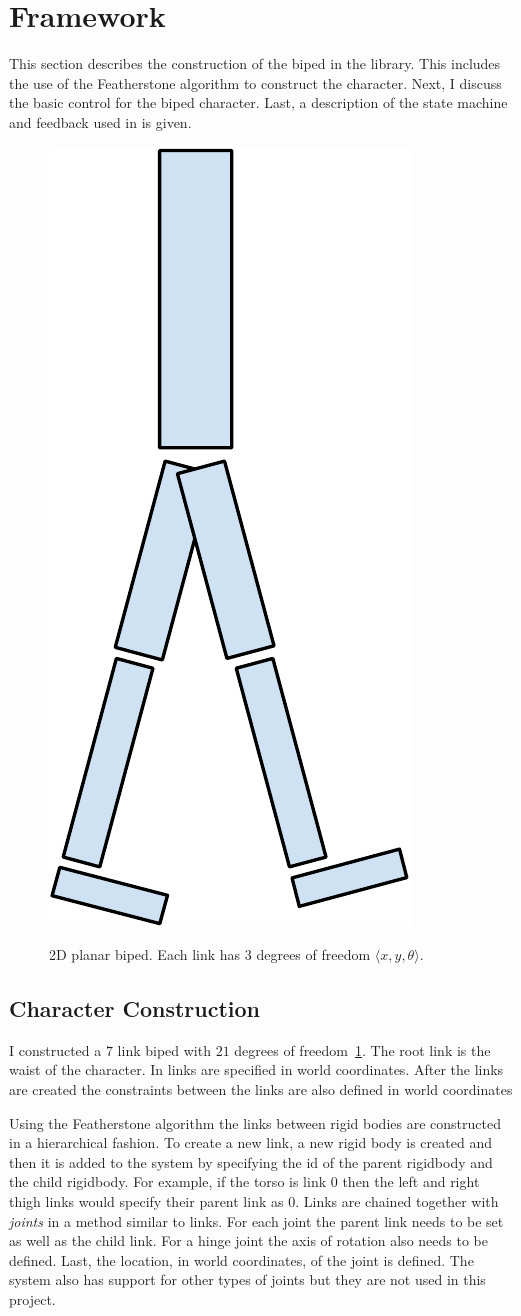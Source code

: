 
\section{Framework}
\label{sec:framework}

This section describes the construction of the biped in the \bulletPhysics library. This includes the use of the Featherstone algorithm to construct the character. Next, I discuss the basic control for the biped character. Last, a description of the state machine and feedback used in \SIMBICON is given. 

\begin{figure}[H]
\centering
	\includegraphics[width=0.2\linewidth]{../images/2D-Biped-crop.pdf} \\
	\caption{\label{figure:2d-biped} 2D planar biped. Each link has $3$ degrees of freedom $\langle x, y, \theta \rangle$.}
\end{figure}

\subsection{Character Construction}

I constructed a $7$ link biped with $21$ degrees of freedom~\ref{figure:2d-biped}. 
The root link is the waist of the character.
In \bulletPhysics links are specified in world coordinates.
After the links are created the constraints between the links are also defined in world coordinates
 
Using the Featherstone algorithm the links between rigid bodies are constructed in a hierarchical fashion. 
To create a new link, a new rigid body is created and then it is added to the system by specifying the id of the parent rigidbody and the child rigidbody. 
For example, if the torso is link $0$ then the left and right thigh links would specify their parent link as $0$.
Links are chained together with \emph{joints} in a method similar to links.
For each joint the parent link needs to be set as well as the child link.
For a hinge joint the axis of rotation also needs to be defined.
Last, the location, in world coordinates, of the joint is defined.
The system also has support for other types of joints but they are not used in this project.

